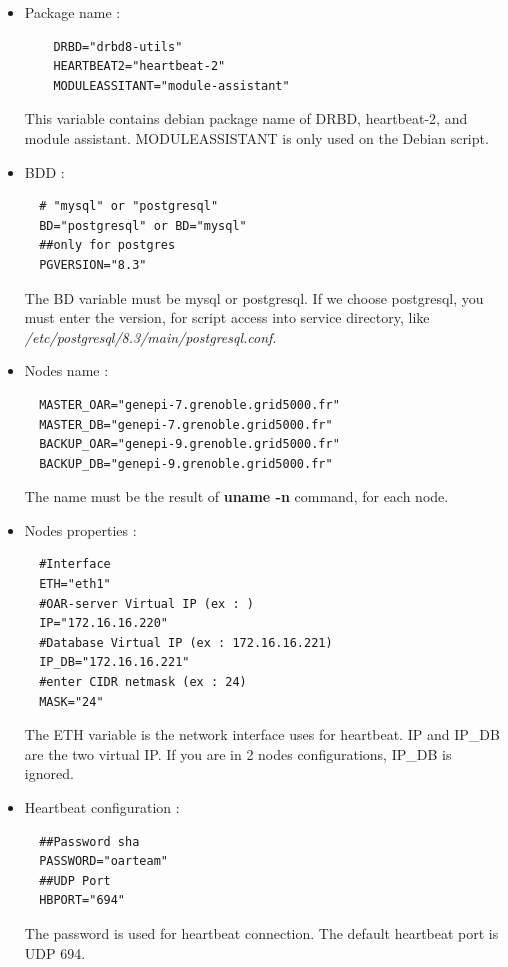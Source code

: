 \documentclass[a4paper,10pt]{report}
\begin{document}
\begin{itemize}
 \item Package name :\\
    \begin{lstlisting}
    DRBD="drbd8-utils"
    HEARTBEAT2="heartbeat-2"
    MODULEASSITANT="module-assistant"
    \end{lstlisting}
  This variable contains debian package name of DRBD, heartbeat-2, and module assistant. MODULEASSISTANT is only used on the Debian script.

 \item BDD :\\
  \begin{lstlisting}
  # "mysql" or "postgresql"
  BD="postgresql" or BD="mysql"
  ##only for postgres
  PGVERSION="8.3"
  \end{lstlisting}
The BD variable must be mysql or postgresql. If we choose postgresql, you must enter the version, for script access into service directory, like \textit{/etc/postgresql/8.3/main/postgresql.conf}.

 \item Nodes name :\\
  \begin{lstlisting}
  MASTER_OAR="genepi-7.grenoble.grid5000.fr"
  MASTER_DB="genepi-7.grenoble.grid5000.fr"
  BACKUP_OAR="genepi-9.grenoble.grid5000.fr"
  BACKUP_DB="genepi-9.grenoble.grid5000.fr"
  \end{lstlisting}
The name must be the result of \textbf{uname -n} command, for each node.

  \item Nodes properties :\\
  \begin{lstlisting}
  #Interface
  ETH="eth1"
  #OAR-server Virtual IP (ex : )
  IP="172.16.16.220"
  #Database Virtual IP (ex : 172.16.16.221)
  IP_DB="172.16.16.221"
  #enter CIDR netmask (ex : 24)
  MASK="24"
  \end{lstlisting}
The ETH variable is the network interface uses for heartbeat. IP and IP\_DB are the two virtual IP. If you are in 2 nodes configurations, IP\_DB is ignored.

  \item Heartbeat configuration :\\
  \begin{lstlisting}
  ##Password sha
  PASSWORD="oarteam"
  ##UDP Port
  HBPORT="694"
  \end{lstlisting}
The password is used for heartbeat connection. The default heartbeat port is UDP 694.


\end{itemize}
\end{document}
